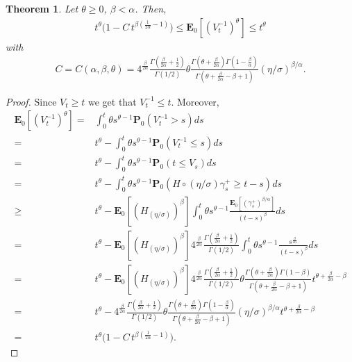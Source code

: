 \documentclass[[11pt,a4paper,reqno]{article}
\newtheorem{theorem}{Theorem}[section]
\numberwithin{equation}{section}
\begin{document}
\begin{theorem}
    Let $\theta\geq 0$, $\beta < \alpha$. Then,
    \begin{align}
         t^\theta \big( 1 - C\, t^{\beta (\frac{1}{2\alpha} -1)}\big) \leq \mathbf{E}_0[(V^{-1}_t)^\theta] \leq t^\theta
    \end{align}
    with
    \begin{align}
        C=C(\alpha, \beta, \theta) = 4^\frac{\beta}{2\alpha} \frac{\Gamma(\frac{\beta}{2\alpha} + \frac{1}{2})}{\Gamma(1/2)} \theta \frac{\Gamma(\theta + \frac{\beta}{2\alpha}) \Gamma(1-\frac{\beta}{\alpha})}{\Gamma(\theta + \frac{\beta}{2\alpha} - \beta +1 )} (\eta/\sigma)^{\beta/\alpha}.
    \end{align}
    \label{thm:momentsInvVbar}
\end{theorem}
\begin{proof}
    Since $V_t \geq t$ we get that $V^{-1}_t \leq t$. Moreover, 
\begin{align*}
    \mathbf{E}_0[(V^{-1}_t)^\theta] 
    = & \int_0^t \theta s^{\theta -1} \mathbf{P}_0(V^{-1}_t > s) ds\\
    = & t^\theta - \int_0^t \theta s^{\theta -1} \mathbf{P}_0(V^{-1}_t \leq s) ds\\
    = & t^\theta - \int_0^t \theta s^{\theta -1} \mathbf{P}_0(t \leq V_s) ds\\
    = & t^\theta - \int_0^t \theta s^{\theta -1} \mathbf{P}_0(H \circ (\eta/\sigma) \gamma^+_s  \geq t-s) ds\\
    \geq & t^\theta - \mathbf{E}_0[(H_{(\eta/\sigma)})^\beta] \int_0^t \theta s^{\theta -1} \frac{\mathbf{E}_0[(\gamma^+_s)^{\beta/\alpha}]}{(t-s)^\beta} ds\\
    = & t^\theta - \mathbf{E}_0[(H_{(\eta/\sigma)})^\beta] 4^\frac{\beta}{2\alpha} \frac{\Gamma(\frac{\beta}{2\alpha} + \frac{1}{2})}{\Gamma(1/2)} \int_0^t \theta s^{\theta -1} \frac{s^\frac{\beta}{2\alpha}}{(t-s)^\beta} ds\\
    = & t^\theta - \mathbf{E}_0[(H_{(\eta/\sigma)})^\beta] 4^\frac{\beta}{2\alpha} \frac{\Gamma(\frac{\beta}{2\alpha} + \frac{1}{2})}{\Gamma(1/2)} \theta \frac{\Gamma(\theta + \frac{\beta}{2\alpha}) \Gamma(1-\beta)}{\Gamma(\theta + \frac{\beta}{2\alpha} - \beta +1 )} t^{\theta + \frac{\beta}{2\alpha} - \beta}\\
    = & t^\theta - 4^\frac{\beta}{2\alpha} \frac{\Gamma(\frac{\beta}{2\alpha} + \frac{1}{2})}{\Gamma(1/2)} \theta \frac{\Gamma(\theta + \frac{\beta}{2\alpha}) \Gamma(1-\frac{\beta}{\alpha})}{\Gamma(\theta + \frac{\beta}{2\alpha} - \beta +1 )} (\eta/\sigma)^{\beta/\alpha}  t^{\theta + \frac{\beta}{2\alpha} - \beta}\\
    = & t^\theta \big( 1 - C\, t^{\beta (\frac{1}{2\alpha} -1)}\big).
\end{align*}
\end{proof}
\end{document}
